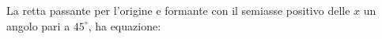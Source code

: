 La retta passante per l’origine e formante con il semiasse positivo delle \( \displaystyle x\) 
un angolo pari a \( \displaystyle 45^{\circ}\), ha
equazione: 